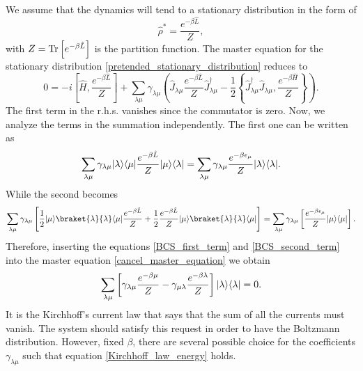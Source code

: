 We assume that the dynamics will tend to a stationary distribution in the form of
\begin{equation}\label{pretended_stationary_distribution}
    \hat \rho^* = \frac{e^{-\beta\hat L}}{Z},
\end{equation}
with $Z = \operatorname{Tr}\left[e^{-\beta\hat L}\right]$ is the partition function.
The master equation for the stationary distribution \eqref{pretended_stationary_distribution} reduces to
\begin{equation}\label{cancel_master_equation}
    0 = -i\left[\hat H, \frac{e^{-\beta\hat L}}{Z}\right] + \sum_{\lambda\mu} \gamma_{\lambda\mu} \left(\hat J_{\lambda\mu}  \frac{e^{-\beta\hat L}}{Z} \hat J^\dagger_{\lambda\mu} - \frac{1}{2}\left\{ \hat J^\dagger_{\lambda\mu}\hat J_{\lambda\mu},  \frac{e^{-\beta\hat H}}{Z}\right\} \right).
\end{equation}
The first term in the r.h.s. vanishes since the commutator is zero.
Now, we analyze the terms in the summation independently.
The first one can be written as 
\begin{equation}\label{BCS_first_term}
        \sum_{\lambda\mu} \gamma_{\lambda\mu} \lvert\lambda\rangle\langle\mu\rvert\frac{e^{-\beta\hat L}}{Z} \lvert\mu\rangle\langle\lambda\rvert = 
        \sum_{\lambda\mu} \gamma_{\lambda\mu} \frac{e^{-\beta \epsilon_\mu}}{Z} \lvert\lambda\rangle\langle\lambda\rvert.
\end{equation}
While the second becomes
\begin{equation}\label{BCS_second_term}
    \sum_{\lambda\mu} \gamma_{\lambda\mu}\left[\frac{1}{2}\ket{\mu}\braket{\lambda}{\lambda}\bra{\mu}\frac{e^{-\beta\hat L}}{Z} +\frac{1}{2}\frac{e^{-\beta\hat L}}{Z}\ket{\mu}\braket{\lambda}{\lambda}\bra{\mu}\right]= \sum_{\lambda\mu} \gamma_{\lambda\mu}\left[\frac{e^{-\beta \epsilon_\mu}}{Z}\ket{\mu}\bra{\mu}\right].
\end{equation}
Therefore, inserting the equations \eqref{BCS_first_term} and \eqref{BCS_second_term} into the master equation \eqref{cancel_master_equation} we obtain 
\begin{equation}\label{Kirchhoff_law_energy}
    \sum_{\lambda\mu}\left[\gamma_{\lambda\mu}\frac{e^{-\beta \mu}}{Z} - \gamma_{\mu\lambda}\frac{e^{-\beta \lambda}}{Z}\right]\lvert\lambda\rangle\langle\lambda\rvert = 0.
\end{equation}
It is the Kirchhoff's current law that says that the sum of all the currents must vanish. The system should satisfy this request in order to have the Boltzmann distribution.
However, fixed $\beta$, there are several possible choice for the coefficients $\gamma_{\lambda\mu}$ such that equation \eqref{Kirchhoff_law_energy} holds.
